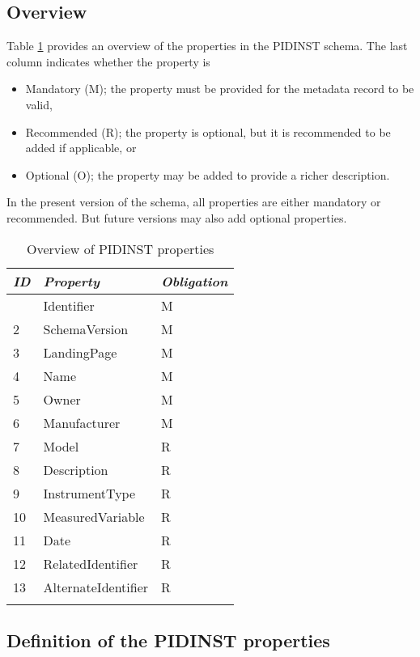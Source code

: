 \documentclass[titlepage=true,twoside=false,DIV=13]{scrartcl}
\begin{document}
\subsection{Overview}

Table \ref{schema:tab:propoverview} provides an overview of the
properties in the PIDINST schema.  The last column indicates whether
the property is
\begin{itemize}
\item Mandatory (M); the property must be provided for the metadata
  record to be valid,
\item Recommended (R); the property is optional, but it is recommended
  to be added if applicable, or
\item Optional (O); the property may be added to provide a richer
  description.
\end{itemize}
In the present version of the schema, all properties are either
mandatory or recommended.  But future versions may also add optional
properties.

\begin{longtable}{|l|l|l|}
  \hline
  \emph{ID} & \emph{Property} & \emph{Obligation} \\
  \hline \endhead
  \hline \endfoot\endlastfoot
  1     & Identifier          & M \\
  2     & SchemaVersion       & M \\
  3     & LandingPage         & M \\
  4     & Name                & M \\
  5     & Owner               & M \\
  6     & Manufacturer        & M \\
  7     & Model               & R \\
  8     & Description         & R \\
  9     & InstrumentType      & R \\
  10    & MeasuredVariable    & R \\
  11    & Date                & R \\
  12    & RelatedIdentifier   & R \\
  13    & AlternateIdentifier & R \\
  \hline
  \caption{Overview of PIDINST properties}
  \label{schema:tab:propoverview}
\end{longtable}

\subsection{Definition of the PIDINST properties}
\end{document}
